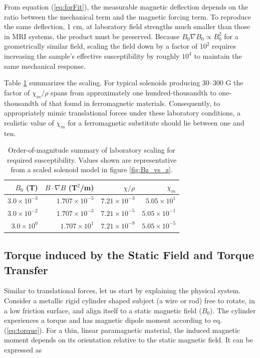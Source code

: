 From equation (\ref{eq:forFit}), the measurable magnetic deflection depends on the ratio between the mechanical term  and the magnetic forcing term. To reproduce the same deflection, 1 cm, at laboratory field strengths much smaller than those in MRI systems, the product must be preserved. Because $B_0 \nabla B_0 \propto B^2_0$ for a geometrically similar field, scaling the field down by a factor of  $10^2$ requires increasing the sample’s effective susceptibility by roughly $10^4$ to maintain the same mechanical response.

Table \ref{tab:chi_scaling} summarizes the scaling. For typical solenoids producing 30–300 G the factor of $\chi_m/\rho$ spans from approximately one hundred-thousandth to one-thousandth of that found in ferromagnetic materials. Consequently, to appropriately mimic translational forces under these laboratory conditions, a realistic value of $\chi_m$ for a ferromagnetic substitute should lie between one and ten.

\begin{table}[htb]
	\centering
	\caption{Order-of-magnitude summary of laboratory scaling for required susceptibility. 
		Values shown are representative from a scaled solenoid model in figure \ref{fig:Bz_vs_z}.}
	\label{tab:chi_scaling}
	\begin{tabular}{r r r r}
		\toprule
		$B_0$ (T) & $B\!\cdot\!\nabla B$ (T$^2$/m) & $\chi / \rho$ & $\chi_m$ \\
		\midrule
		$3.0\times10^{-3}$ & $1.707\times10^{-5}$ &  $7.21\times10^{-3}$ & $5.05\times10^{1}$   \\
		$3.0\times10^{-2}$ & $1.707\times10^{-3}$ & $7.21\times10^{-5}$& $5.05\times10^{-1}$   \\
		$3.0\times10^{0}$ & $1.707\times10^{1}$ & $7.21\times10^{-9}$& $5.05\times10^{-5}$   \\
		\bottomrule
	\end{tabular}
\end{table}



\subsection{Torque induced by the Static Field and Torque Transfer}
\label{sec:torqueBG}

Similar to translational forces, let us start by explaining the physical system. Consider a metallic rigid cylinder shaped subject (a wire or rod) free to rotate, in a low friction surface, and align itself to a static magnetic field ($B_0$). The cylinder experiences a torque and has magnetic dipole moment according to eq. (\ref{eq:torque}). For a thin, linear paramagnetic material, the induced magnetic moment depends on its orientation relative to the static magnetic field. It can be expressed as

